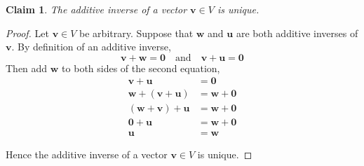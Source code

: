 \documentclass{article}
\newtheorem*{claim}{Claim}
\begin{document}
\begin{claim}
    The additive inverse of a vector $\mathbf{v} \in V$ is unique.
\end{claim}

\begin{proof}
    Let $\mathbf{v} \in V$ be arbitrary. Suppose that $\mathbf{w}$ and $\mathbf{u}$ are both additive inverses 
    of $\mathbf{v}$. By definition of an additive inverse, 
    \[
    \mathbf{v} + \mathbf{w} = \mathbf{0} \quad \text{and} \quad \mathbf{v} + \mathbf{u} = \mathbf{0}
    \]
    Then add $\mathbf{w}$ to both sides of the second equation, 
    \[
    \begin{aligned}
        \mathbf{v} + \mathbf{u} &= \mathbf{0} \\
        \mathbf{w} + (\mathbf{v} + \mathbf{u}) &= \mathbf{w} + \mathbf{0} \\
        (\mathbf{w} + \mathbf{v}) + \mathbf{u} &= \mathbf{w} + \mathbf{0} \\
        \mathbf{0} + \mathbf{u} &= \mathbf{w} + \mathbf{0} \\
        \mathbf{u} &= \mathbf{w}
    \end{aligned}
    \]

    \medskip

    Hence the additive inverse of a vector $\mathbf{v} \in V$ is unique.
\end{proof}
\end{document}
